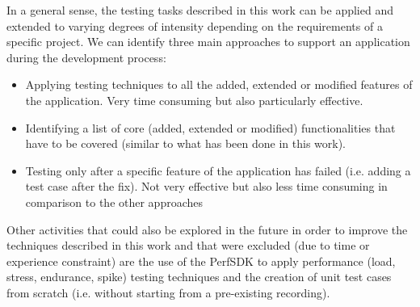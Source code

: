 In a general sense, the testing tasks described in this work can be applied and extended to varying degrees of intensity depending on the requirements of a specific project. We can identify three main approaches to support an application during the development process:
\begin{itemize}
    \item Applying testing techniques to all the added, extended or modified features of the application. Very time consuming but also particularly effective.
    \item Identifying a list of core (added, extended or modified) functionalities that have to be covered (similar to what has been done in this work). 
    \item Testing only after a specific feature of the application has failed (i.e. adding a test case after the fix). Not very effective but also less time consuming in comparison to the other approaches 
\end{itemize}

Other activities that could also be explored in the future in order to improve the techniques described in this work and that were excluded (due to time or experience constraint) are the use of the PerfSDK to apply performance (load, stress, endurance, spike) testing techniques and the creation of unit test cases from scratch (i.e. without starting from a pre-existing recording).